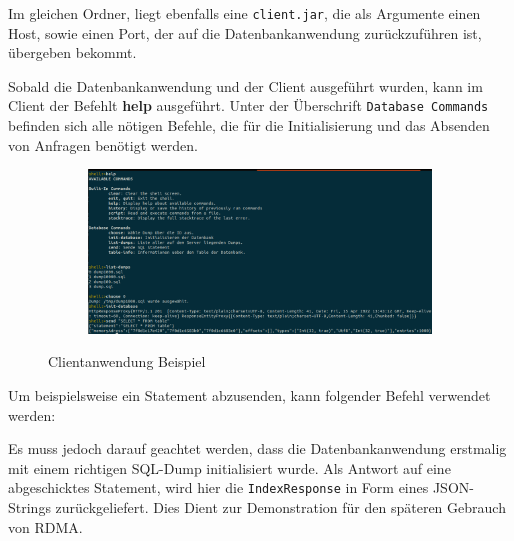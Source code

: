 Im gleichen Ordner, liegt ebenfalls eine \texttt{client.jar}, die als Argumente einen Host, sowie einen Port, der auf die Datenbankanwendung zurückzuführen ist, übergeben bekommt.

\begin{center}
\end{center}

Sobald die Datenbankanwendung und der Client ausgeführt wurden, kann im Client der Befehlt \textbf{help} ausgeführt. Unter der Überschrift \texttt{Database Commands} befinden sich alle nötigen Befehle, die für die Initialisierung und das Absenden von Anfragen benötigt werden.

\begin{figure}[h]
  \centering
  \begin{subfigure}[b]{1.0\textwidth}
    \includegraphics[width=1.0\linewidth]{img/client}
  \end{subfigure}
  \caption{Clientanwendung Beispiel}
  \label{graf_9}
\end{figure}


Um beispielsweise ein Statement abzusenden, kann folgender Befehl verwendet werden:

\begin{center}
\end{center}

Es muss jedoch darauf geachtet werden, dass die Datenbankanwendung erstmalig mit einem richtigen SQL-Dump initialisiert wurde. Als Antwort auf eine abgeschicktes Statement, wird hier die \texttt{IndexResponse} in Form eines JSON-Strings zurückgeliefert. Dies Dient zur Demonstration für den späteren Gebrauch von RDMA.



